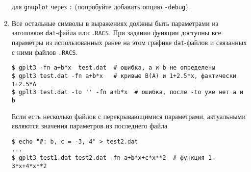 \documentclass[12pt]{article}
\def\gnuplot{{\tt gnuplot}}
\begin{document}
\begin{enumerate}
  для \gnuplot{} через \verb':' (попробуйте добавить опцию \verb'-debug').
\item Все остальные символы в выражениях должны быть параметрами из заголовков \verb'dat'-файла или \verb'.RACS'. 
При задании функции доступны все параметры из использованных ранее на этом графике \verb'dat'-файлов и связанных с ними файлов \verb'.RACS'.
\begin{verbatim}
$ gplt3 -fn a+b*x  test.dat  # ошибка, a и b не определены
$ gplt3 test.dat -fn a+b*x   # кривые B(A) и 1+2.5*x, фактически 1+2.5*A
$ gplt3 test.dat -to '' -fn a+b*x  # ошибка, после -to уже нет a и b
\end{verbatim}
Если есть несколько файлов с перекрывающимися параметрами, актуальными являются значения параметров из последнего файла
\begin{verbatim}
$ echo "#: b, c = -3, 4" > test2.dat 
...
$ gplt3 test1.dat test2.dat -fn a+b*x+c*x**2  # функция 1-3*x+4*x**2
\end{verbatim}
\end{enumerate}
\end{document}
